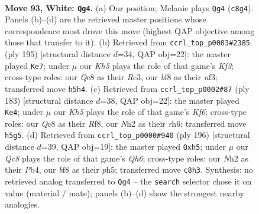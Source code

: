 \documentclass[11pt]{article}
\begin{document}
\clearpage

\begin{figure}[p]\centering
\begin{subfigure}{0.46\textwidth}\centering
\resizebox{\linewidth}{!}{%
\newchessgame
\chessboard[
  setfen={1RQ2b2/5r1k/R7/7K/8/8/7N/8 w - - 3 93},
  showmover=false,
  pgfstyle=straightmove, color=movearrow, markmove={c8-g4}
]}
\caption{}
\end{subfigure}\hfill
\begin{subfigure}{0.46\textwidth}\centering
\resizebox{\linewidth}{!}{%
\newchessgame
\chessboard[
  setfen={6R1/8/5k2/8/8/r1r2N2/6K1/8 b - - 67 98},
  showmover=false,
  pgfstyle=straightmove, color=movearrow, markmove={f6-e7}
]}
\caption{}
\end{subfigure}
\\[4pt]
\begin{subfigure}{0.46\textwidth}\centering
\resizebox{\linewidth}{!}{%
\newchessgame
\chessboard[
  setfen={5r2/8/7R/3R1N2/6r1/5k2/7K/8 b - - 45 92},
  showmover=false,
  pgfstyle=straightmove, color=movearrow, markmove={f3-e4}
]}
\caption{}
\end{subfigure}\hfill
\begin{subfigure}{0.46\textwidth}\centering
\resizebox{\linewidth}{!}{%
\newchessgame
\chessboard[
  setfen={8/b3k3/7Q/7p/1P2K3/r7/8/8 w - - 3 99},
  showmover=false,
  pgfstyle=straightmove, color=movearrow, markmove={h6-h5}
]}
\caption{}
\end{subfigure}
\caption{\textbf{Move 93, White: \texttt{Qg4}.} (a) Our position; Melanie plays \texttt{Qg4} (\texttt{c8g4}). Panels (b)--(d) are the retrieved master positions whose correspondence most drove this move (highest QAP objective among those that transfer to it). (b) Retrieved from \texttt{ccrl\_top\_p0003\#2385} (ply 195) [structural distance $d$=34, QAP obj=22]: the master played \texttt{Ke7}; under $\mu$ our \emph{Kh5} plays the role of that game's \emph{Kf3}; cross-type roles: our \emph{Q}c8 as their \emph{R}c3, our \emph{b}f8 as their \emph{n}f3; transferred move \texttt{h5h4}. (c) Retrieved from \texttt{ccrl\_top\_p0002\#87} (ply 183) [structural distance $d$=38, QAP obj=22]: the master played \texttt{Ke4}; under $\mu$ our \emph{Kh5} plays the role of that game's \emph{Kf6}; cross-type roles: our \emph{Q}c8 as their \emph{R}f8, our \emph{N}h2 as their \emph{r}h6; transferred move \texttt{h5g5}. (d) Retrieved from \texttt{ccrl\_top\_p0000\#940} (ply 196) [structural distance $d$=39, QAP obj=19]: the master played \texttt{Qxh5}; under $\mu$ our \emph{Qc8} plays the role of that game's \emph{Qh6}; cross-type roles: our \emph{N}h2 as their \emph{P}b4, our \emph{b}f8 as their \emph{p}h5; transferred move \texttt{c8h3}. Synthesis: no retrieved analog transferred to \texttt{Qg4} -- the \texttt{search} selector chose it on value (material / mate); panels (b)--(d) show the strongest nearby analogies.}
\label{fig:thought-m184}
\end{figure}
\end{document}
